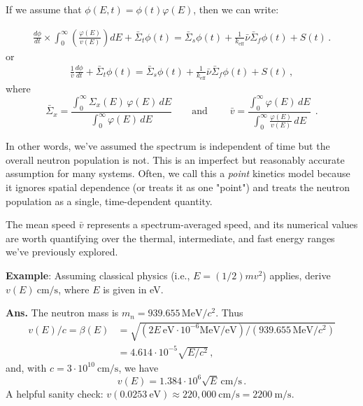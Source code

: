 \documentclass[compact]{ne630handout}
\begin{document}
\begin{handoutflow}
 

If we assume that $\phi(E, t) = \phi(t)\varphi(E)$, then we can write:

\begin{align*}
\frac{d\phi}{dt} \times \int^{\infty}_0
\left ( \frac{\varphi(E)}{v(E)} \right ) dE
 + \bar{\Sigma}_t \phi(t)
  = \bar{\Sigma}_s \phi(t)  + \frac{1}{k_{\text{eff}}} \bar{\nu}\bar{\Sigma}_f \phi(t) + S(t)  \, .
\end{align*}
or
\begin{align*}
\tag{25.1}
  \boxed{ \frac{1}{\bar{v}}\frac{d\phi}{dt}
 + \bar{\Sigma}_t \phi(t)
  = \bar{\Sigma}_s \phi(t)  + \frac{1}{k_{\text{eff}}} \bar{\nu}\bar{\Sigma}_f \phi(t) + S(t)  } \, ,
\end{align*}
where %
\begin{equation*}
\bar\Sigma_x=\frac{\displaystyle \int_0^\infty \Sigma_x(E)\,\varphi(E)\,dE}{\displaystyle \int_0^\infty \varphi(E)\,dE}
\qquad \text{and} \qquad
\tag{25.2}
\boxed{\;\bar v=\frac{\displaystyle \int_0^\infty \varphi(E)\,dE}{\displaystyle \int_0^\infty \frac{\varphi(E)}{v(E)}\,dE}\; \, .}
\end{equation*}

In other words, we've assumed the spectrum is independent of time but the overall neutron population is not.  This is an imperfect but reasonably accurate assumption for many systems.
Often, we call this a {\it point} kinetics model because it ignores spatial dependence (or treats it as one "point") and treats the neutron population as a single, time-dependent quantity.
 
 
\columnbreak


The mean speed $\bar{v}$ represents a spectrum-averaged speed, and its numerical values are worth
quantifying over the thermal, intermediate, and fast energy ranges we've
previously explored.


\vspace{5pt} 

{\bf Example}:  Assuming classical physics (i.e., $E = (1/2)mv^2$) applies,
derive $v(E)~\si{\centi\meter\per\second}$, where $E$ is given in \si{\electronvolt}.

\vspace{3pt} 

\textcolor{wcprimary}{
\textbf{Ans.} The neutron mass is $m_n = 939.655 \, \si{\mega\electronvolt}/c^2$. Thus
\begin{align*}
 v(E)/c = \beta(E)
        &= \sqrt{ (2 E~\si{\electronvolt} \cdot 10^{-6} \si{\mega\electronvolt\per\electronvolt} ) / (939.655\,  \si{\mega\electronvolt}/c^2)} \\
        &= 4.614\cdot 10^{-5}\sqrt{E/c^2} \, ,
\end{align*}
and, with $c=3\cdot 10^{10}~\si{\centi\meter\per\second}$, we have
\begin{equation*}
 \boxed{v(E) = 1.384\cdot 10^{6}\sqrt{E} \, \si{\centi\meter\per\second} } \, .
\end{equation*}
A helpful sanity check: $v(0.0253~\si{\electronvolt}) \approx 220,000~\si{\centi\meter\per\second} = 2200~\si{\meter\per\second}$.
}


\end{handoutflow}
\end{document}
